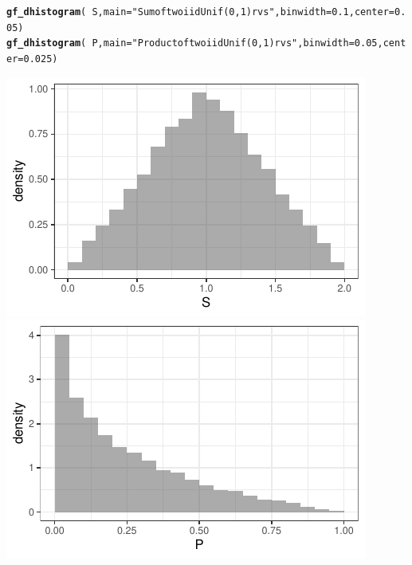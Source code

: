 \documentclass[twoside]{book}\usepackage[]{graphicx}\usepackage[]{xcolor}
\makeatletter
\def\maxwidth{ %
  \ifdim\Gin@nat@width>\linewidth
    \linewidth
  \else
    \Gin@nat@width
  \fi
}
\newcommand{\hlnum}[1]{\textcolor[rgb]{0.686,0.059,0.569}{#1}}%
\newcommand{\hlstr}[1]{\textcolor[rgb]{0.192,0.494,0.8}{#1}}%
\newcommand{\hlopt}[1]{\textcolor[rgb]{0,0,0}{#1}}%
\newcommand{\hlstd}[1]{\textcolor[rgb]{0.345,0.345,0.345}{#1}}%
\newcommand{\hlkwc}[1]{\textcolor[rgb]{0.333,0.667,0.333}{#1}}%
\newcommand{\hlkwd}[1]{\textcolor[rgb]{0.737,0.353,0.396}{\textbf{#1}}}%
\newenvironment{kframe}{%
 \def\at@end@of@kframe{}%
 \ifinner\ifhmode%
  \def\at@end@of@kframe{\end{minipage}}%
  \begin{minipage}{\columnwidth}%
 \fi\fi%
 \def\FrameCommand##1{\hskip\@totalleftmargin \hskip-\fboxsep
 \colorbox{shadecolor}{##1}\hskip-\fboxsep
     \hskip-\linewidth \hskip-\@totalleftmargin \hskip\columnwidth}%
 \MakeFramed {\advance\hsize-\width
   \@totalleftmargin\z@ \linewidth\hsize
   \@setminipage}}%
 {\par\unskip\endMakeFramed%
 \at@end@of@kframe}
\newenvironment{knitrout}{}{} %
\makeatother
\begin{document}
\begin{knitrout}
\color{fgcolor}\begin{kframe}
\begin{alltt}
\hlkwd{gf_dhistogram}\hlstd{(} \hlopt{~} \hlstd{S ,} \hlkwc{main} \hlstd{=} \hlstr{"Sum of two iid Unif(0,1) rvs"}\hlstd{,} \hlkwc{binwidth} \hlstd{=} \hlnum{0.1}\hlstd{,} \hlkwc{center} \hlstd{=} \hlnum{0.05}\hlstd{)}
\hlkwd{gf_dhistogram}\hlstd{(} \hlopt{~} \hlstd{P ,} \hlkwc{main} \hlstd{=} \hlstr{"Product of two iid Unif(0,1) rvs"}\hlstd{,} \hlkwc{binwidth} \hlstd{=} \hlnum{0.05}\hlstd{,} \hlkwc{center} \hlstd{=} \hlnum{0.025}\hlstd{)}
\end{alltt}
\end{kframe}

{\centering \includegraphics[width=\maxwidth]{figures/fig-sum-product-uniform-iid-1} 
\includegraphics[width=\maxwidth]{figures/fig-sum-product-uniform-iid-2} 

}



\end{knitrout}
\end{document}
